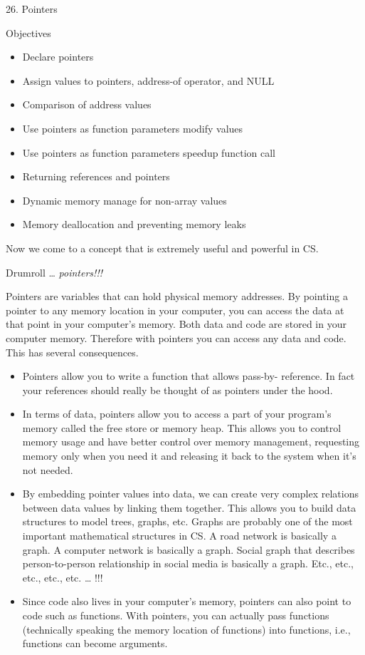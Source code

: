 \documentclass[
]{article}
\author{}
\date{}
\providecommand{\tightlist}{%
  \setlength{\itemsep}{0pt}\setlength{\parskip}{0pt}}
\begin{document}
26. Pointers

Objectives

\begin{itemize}
\tightlist
\item
  Declare pointers
\item
  Assign values to pointers, address-of operator, and NULL
\item
  Comparison of address values
\item
  Use pointers as function parameters modify values
\item
  Use pointers as function parameters speedup function call
\item
  Returning references and pointers
\item
  Dynamic memory manage for non-array values
\item
  Memory deallocation and preventing memory leaks
\end{itemize}

Now we come to a concept that is extremely useful and powerful in CS.

Drumroll \ldots{} \emph{pointers!!!}

Pointers are variables that can hold physical memory addresses. By
pointing a pointer to any memory location in your computer, you can
access the data at that point in your computer's memory. Both data and
code are stored in your computer memory. Therefore with pointers you can
access any data and code. This has several consequences.

\begin{itemize}
\item
  Pointers allow you to write a function that allows pass-by- reference.
  In fact your references should really be thought of as pointers under
  the hood.
\item
  In terms of data, pointers allow you to access a part of your
  program's memory called the free store or memory heap. This allows you
  to control memory usage and have better control over memory
  management, requesting memory only when you need it and releasing it
  back to the system when it's not needed.
\item
  By embedding pointer values into data, we can create very complex
  relations between data values by linking them together. This allows
  you to build data structures to model trees, graphs, etc. Graphs are
  probably one of the most important mathematical structures in CS. A
  road network is basically a graph. A computer network is basically a
  graph. Social graph that describes person-to-person relationship in
  social media is basically a graph. Etc., etc., etc., etc., etc.
  \ldots{} !!!
\item
  Since code also lives in your computer's memory, pointers can also
  point to code such as functions. With pointers, you can actually pass
  functions (technically speaking the memory location of functions) into
  functions, i.e., functions can become arguments.
\end{itemize}
\end{document}
